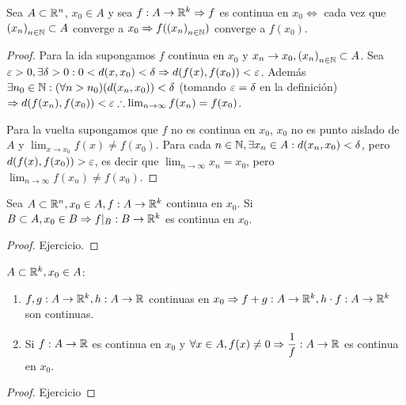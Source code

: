 \begin{prop}
  Sea \(A \subset \mathbb{R}^n\), \(x_0 \in A\) y sea \(f: A \to \mathbb{R}^k \Rightarrow f\) es continua en \(x_0 \iff \) cada vez que \({(x_n)}_{n \in \mathbb{N}} \subset A\) converge a \(x_0 \Rightarrow f({(x_n)}_{n \in \mathbb{N}})\) converge a \(f(x_0)\).
  \begin{proof}
    Para la ida supongamos \(f\) continua en \(x_0\) y \(x_n \to x_0, {(x_n)}_{n \in \mathbb{N}} \subset A\). Sea \(\varepsilon > 0, \exists \delta > 0 : 0 < d(x, x_0) < \delta \Rightarrow d(f(x), f(x_0)) < \varepsilon \).
    Además \(\exists n_0 \in \mathbb{N} : (\forall n > n_0)(d(x_n, x_0)) < \delta \) (tomando \(\varepsilon = \delta \) en la definición) \(\Rightarrow d(f(x_n), f(x_0)) < \varepsilon \therefore \lim_{n \to \infty} f(x_n) = f(x_0)\).

    Para la vuelta supongamos que \(f\) no es continua en \(x_0\), \(x_0\) no es punto aislado de \(A\) y \(\lim_{x \to x_0} f(x) \neq f(x_0)\). Para cada \(n \in \mathbb{N}, \exists x_n \in A : d(x_n, x_0) < \delta \), pero \(d(f(x), f(x_0)) > \varepsilon \), es decir que \(\lim_{n \to \infty} x_n = x_0\), pero \(\lim_{n \to \infty} f(x_n) \neq f(x_0)\).
  \end{proof}
\end{prop}

\begin{prop}
  Sea \(A \subset \mathbb{R}^n, x_0 \in A, f: A \to \mathbb{R}^k\) continua en \(x_0\). Si \(B \subset A, x_0 \in B \Rightarrow f|_B: B \to \mathbb{R}^k\) es continua en \(x_0\).
  \begin{proof}
    Ejercicio.
  \end{proof}
\end{prop}

\begin{prop}
  \(A \subset \mathbb{R}^k, x_0 \in A\):
  \begin{enumerate}
    \item \(f, g: A \to \mathbb{R}^k, h: A \to \mathbb{R} \) continuas en \(x_0 \Rightarrow f+g: A \to \mathbb{R}^k, h \cdot f: A \to \mathbb{R}^k\) son continuas.
    \item Si \(f: A \to \mathbb{R} \) es continua en \(x_0\) y \(\forall x \in A, f(x) \neq 0 \Rightarrow \dfrac{1}{f}: A \to \mathbb{R} \) es continua en \(x_0\).
  \end{enumerate}

  \begin{proof}
    Ejercicio
  \end{proof}
\end{prop}

